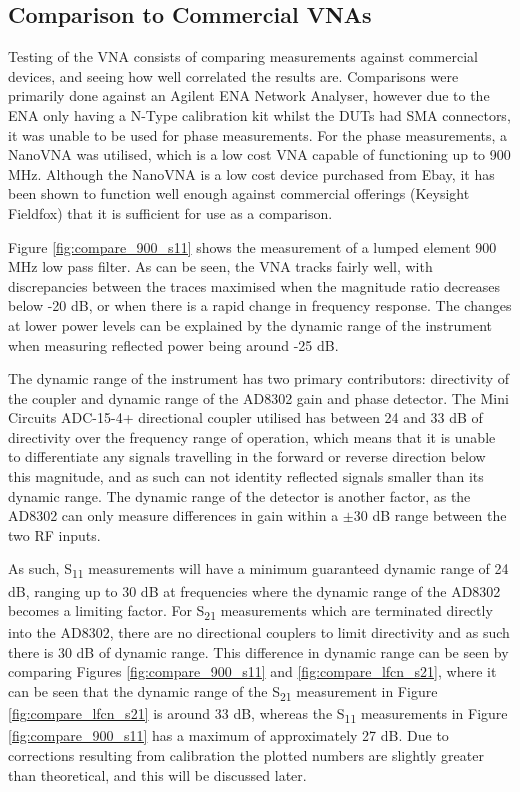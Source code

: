 \subsection{Comparison to Commercial VNAs}

Testing of the VNA consists of comparing measurements against commercial devices, and seeing how well correlated the results are. Comparisons were primarily done against an Agilent ENA Network Analyser, however due to the ENA only having a N-Type calibration kit whilst the DUTs had SMA connectors, it was unable to be used for phase measurements. For the phase measurements, a NanoVNA was utilised, which is a low cost VNA capable of functioning up to 900 MHz. Although the NanoVNA is a low cost device purchased from Ebay, it has been shown to function well enough against commercial offerings (Keysight Fieldfox) \cite{nanoVNA} that it is sufficient for use as a comparison. 

Figure \ref{fig:compare_900_s11} shows the measurement of a lumped element 900 MHz low pass filter. As can be seen, the VNA tracks fairly well, with discrepancies between the traces maximised when the magnitude ratio decreases below -20 dB, or when there is a rapid change in frequency response. The changes at lower power levels can be explained by the dynamic range of the instrument when measuring reflected power being around -25 dB.

The dynamic range of the instrument has two primary contributors: directivity of the coupler and dynamic range of the AD8302 gain and phase detector. The Mini Circuits ADC-15-4+ directional coupler utilised has between 24 and 33 dB of directivity over the frequency range of operation, which means that it is unable to differentiate any signals travelling in the forward or reverse direction below this magnitude, and as such can not identity reflected signals smaller than its dynamic range. The dynamic range of the detector is another factor, as the AD8302 can only measure differences in gain within a $\pm$30 dB range between the two RF inputs. 

As such, S\textsubscript{11} measurements will have a minimum guaranteed dynamic range of 24 dB, ranging up to 30 dB at frequencies where the dynamic range of the AD8302 becomes a limiting factor. For S\textsubscript{21} measurements which are terminated directly into the AD8302, there are no directional couplers to limit directivity and as such there is 30 dB of dynamic range. This difference in dynamic range can be seen by comparing Figures \ref{fig:compare_900_s11} and \ref{fig:compare_lfcn_s21}, where it can be seen that the dynamic range of the S\textsubscript{21} measurement in Figure \ref{fig:compare_lfcn_s21} is around 33 dB, whereas the S\textsubscript{11} measurements in Figure \ref{fig:compare_900_s11} has a maximum of approximately 27 dB. Due to corrections resulting from calibration the plotted numbers are slightly greater than theoretical, and this will be discussed later. 


